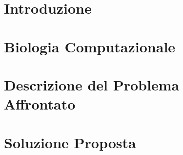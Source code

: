 \documentclass[12pt,a4paper]{report}
\begin{document}


\thispagestyle{empty}



\tableofcontents

\chapter{Introduzione}


\chapter{Biologia Computazionale}
\label{chap:comp_bio}


\chapter{Descrizione del Problema Affrontato}


\chapter{Soluzione Proposta}


\printbibliography
\end{document}
